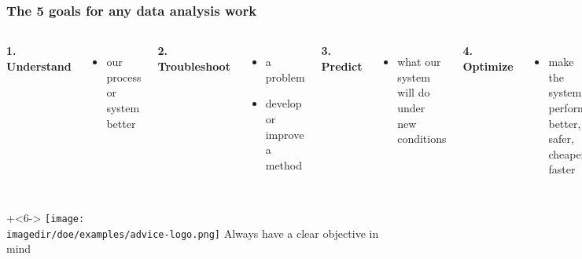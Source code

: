 \documentclass[handout,11pt,aspectratio=169,mathserif]{beamer}
\begin{document}
\begin{frame}\frametitle{The 5 goals for any data analysis work}

	\begin{columns}[t]
		
			\vspace{-12pt}
			\textbf{{\color{purple} 1. Understand}}
			\begin{itemize}
				\item	our process or system better\pause
			\end{itemize}

			\textbf{{\color{purple} 2. Troubleshoot}}
			\begin{itemize}
				\item	a problem
				\item	develop or improve a method\pause
			\end{itemize}

			\textbf{{\color{purple} 3. Predict}}
			\begin{itemize}
				\item	what our system will do under new conditions\pause
			\end{itemize}

			\textbf{{\color{purple} 4. Optimize}}
			\begin{itemize}
				\item	make the system perform better, safer, cheaper, faster\pause
			\end{itemize}

			\textbf{{\color{purple} 5. Monitor}}
			\begin{itemize}
				\item	ensure we keep the gains we have made\pause
			\end{itemize}
			
			\onslide+<3->{
				\texttt{[image: \\imagedir/examples/reactor-design-example/response-surface.png]}
			}
			\onslide+<5->{
				\texttt{[image: \\imagedir/monitoring/Kappa-phaseII-testing.png]}
			}
			
	\end{columns}
	
	\onslide+<6->{
		\hfill \texttt{[image: \\imagedir/doe/examples/advice-logo.png]} {\color{blue}Always have a clear objective in mind}
	}

\end{frame}
\end{document}
